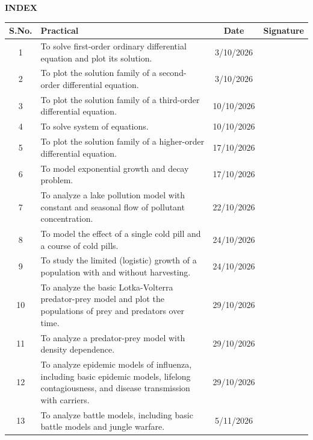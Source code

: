 \documentclass[12pt, a4paper]{article}
\begin{document}
\begin{center}
    {\LARGE \textbf{INDEX}}
\end{center}

\vspace{0.5cm}

\noindent
\begin{tabularx}{\textwidth}{|c|X|c|c|}
    \hline
    \textbf{S.No.} & \textbf{Practical} & \textbf{Date} & \textbf{Signature} \\
    \hline
    1 & To solve first-order ordinary differential equation and plot its solution. & 3/10/2026 & \\
    \hline
    2 & To plot the solution family of a second-order differential equation. & 3/10/2026 & \\
    \hline
    3 & To plot the solution family of a third-order differential equation. & 10/10/2026 & \\
    \hline
    4 & To solve system of equations. & 10/10/2026 & \\
    \hline
    5 & To plot the solution family of a higher-order differential equation. & 17/10/2026 & \\
    \hline
    6 & To model exponential growth and decay problem. & 17/10/2026 & \\
    \hline
    7 & To analyze a lake pollution model with constant and seasonal flow of pollutant concentration. & 22/10/2026 & \\
    \hline
    8 & To model the effect of a single cold pill and a course of cold pills. & 24/10/2026 & \\
    \hline
    9 & To study the limited (logistic) growth of a population with and without harvesting. & 24/10/2026 & \\
    \hline
    10 & To analyze the basic Lotka-Volterra predator-prey model and plot the populations of prey and predators over time. & 29/10/2026 & \\
    \hline
    11 & To analyze a predator-prey model with density dependence. & 29/10/2026 & \\
    \hline
    12 & To analyze epidemic models of influenza, including basic epidemic models, lifelong contagiousness, and disease transmission with carriers. & 29/10/2026 & \\
    \hline
    13 & To analyze battle models, including basic battle models and jungle warfare. & 5/11/2026 & \\
    \hline
\end{tabularx}
\end{document}
